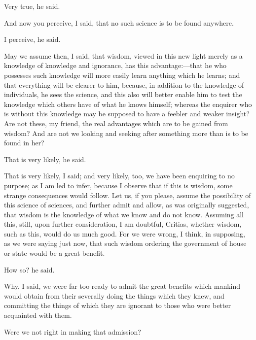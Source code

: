 \documentclass[11pt,letter]{article}
\begin{document}
\par  Very true, he said.

\par  And now you perceive, I said, that no such science is to be found anywhere.

\par  I perceive, he said.

\par  May we assume then, I said, that wisdom, viewed in this new light merely as a knowledge of knowledge and ignorance, has this advantage:—that he who possesses such knowledge will more easily learn anything which he learns; and that everything will be clearer to him, because, in addition to the knowledge of individuals, he sees the science, and this also will better enable him to test the knowledge which others have of what he knows himself; whereas the enquirer who is without this knowledge may be supposed to have a feebler and weaker insight? Are not these, my friend, the real advantages which are to be gained from wisdom? And are not we looking and seeking after something more than is to be found in her?

\par  That is very likely, he said.

\par  That is very likely, I said; and very likely, too, we have been enquiring to no purpose; as I am led to infer, because I observe that if this is wisdom, some strange consequences would follow. Let us, if you please, assume the possibility of this science of sciences, and further admit and allow, as was originally suggested, that wisdom is the knowledge of what we know and do not know. Assuming all this, still, upon further consideration, I am doubtful, Critias, whether wisdom, such as this, would do us much good. For we were wrong, I think, in supposing, as we were saying just now, that such wisdom ordering the government of house or state would be a great benefit.

\par  How so? he said.

\par  Why, I said, we were far too ready to admit the great benefits which mankind would obtain from their severally doing the things which they knew, and committing the things of which they are ignorant to those who were better acquainted with them.

\par  Were we not right in making that admission?
\end{document}
